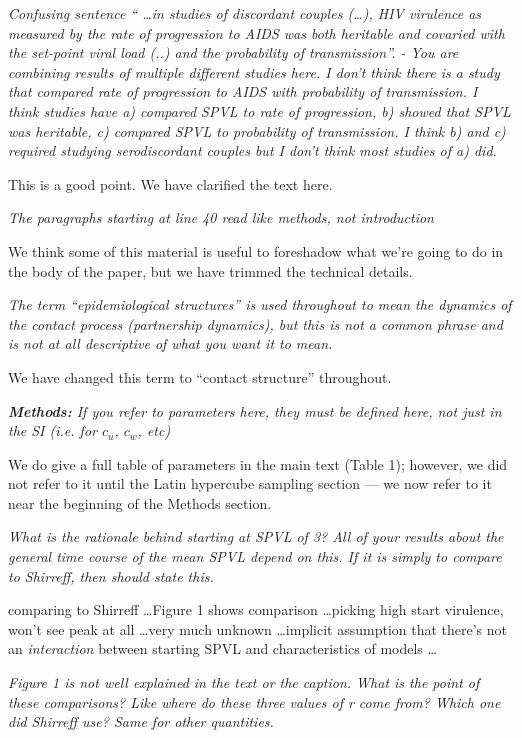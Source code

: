 \documentclass[10pt]{letter}
\newcommand{\revcomment}[1]{\emph{#1}}
\newcommand{\response}[1]{#1}
\begin{document}
\begin{letter}{
}
\revcomment{
Confusing sentence “ …in studies of discordant couples (…), HIV virulence as measured by the rate of progression to AIDS was both heritable and covaried with the set-point viral load (..) and the probability of transmission”.
- You are combining results of multiple different studies here. I don’t think there is a study that compared rate of progression to AIDS with probability of transmission. I think studies have a) compared SPVL to rate of progression, b) showed that SPVL was heritable, c) compared SPVL to probability of transmission. I think b) and c) required studying serodiscordant couples but I don’t think most studies of a) did.
}

\response{
This is a good point. We have clarified the text here.
}

\revcomment{
The paragraphs starting at line 40 read like methods, not introduction
}

\response{
We think some of this material is useful to foreshadow what we're
going to do in the body of the paper, but we have trimmed the
technical details.
}

\revcomment{
The term “epidemiological structures” is used throughout to mean the dynamics of the contact process (partnership dynamics), but this is not a common phrase and is not at all descriptive of what you want it to mean.
}

\response{We have changed this term to ``contact structure'' throughout.}

\revcomment{\textbf{Methods:}
If you refer to parameters here, they must be defined here, not just in the SI (i.e. for $c_u$, $c_w$, etc)
}

\response{We do give a full table of parameters in the main text (Table 1); 
however, we did not refer to it until the Latin hypercube sampling section --- %
we now refer to it near the beginning of the Methods section.}

\revcomment{
What is the rationale behind starting at SPVL of 3? All of your results about the general time course of the mean SPVL depend on this. If it is simply to compare to Shirreff, then should state this.
}



\response{comparing to Shirreff \ldots Figure 1 shows comparison \ldots picking high start virulence, won't see peak at all \ldots very much unknown \ldots implicit assumption that there's not an \emph{interaction} between starting SPVL and characteristics of models \ldots}

\revcomment{
Figure 1 is not well explained in the text or the caption. What is the point of these comparisons? Like where do these three values of r come from? Which one did Shirreff use? Same for other quantities.
}


\end{letter}
\end{document}
